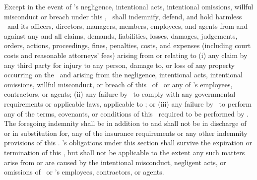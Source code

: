 Except in the event of \lessee’s negligence, intentional acts, intentional omissions, willful misconduct or breach under this \amendmentTitle, \lessor\ shall indemnify, defend, and hold harmless \lessee\ and its officers, directors, managers, members, employees, and agents from and against any and all claims, demands, liabilities, losses, damages, judgements, orders, actions, proceedings, fines, penalties, costs, and expenses (including court costs and reasonable attorneys’ fees) arising from or relating to (i) any claim by any third party for injury to any person, damage to, or loss of any property occurring on the \property\ and arising from the negligence, intentional acts, intentional omissions, willful misconduct, or breach of this \amendmentTitle\ of \lessor\ or any of \lessor’s employees, contractors, or agents; (ii) any failure by \lessor\ to comply with any governmental requirements or applicable laws, applicable to \lessor; or (iii) any failure by \lessor\ to perform any of the terms, covenants, or conditions of this \amendmentTitle\ required to be performed by \lessor. The foregoing indemnity shall be in addition to and shall not be in discharge of or in substitution for, any of the insurance requirements or any other indemnity provisions of this \amendmentTitle. \lessor’s obligations under this section shall survive the expiration or termination of this \amendmentTitle, but shall not be applicable to the extent any such matters arise from or are caused by the intentional misconduct, negligent acts, or omissions of \lessee\ or \lessee’s employees, contractors, or agents.
